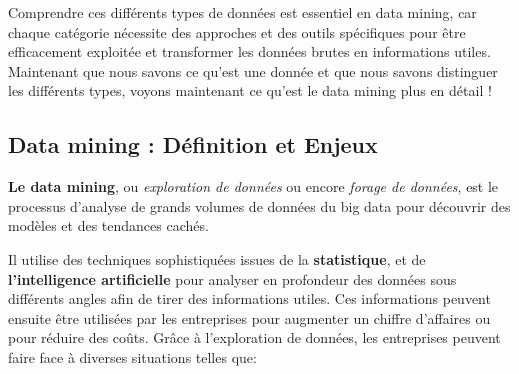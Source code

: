 \documentclass[a4paper,14pt]{article}
\begin{document}
        Comprendre ces différents types de données est essentiel en data mining, car chaque catégorie nécessite des approches et des outils spécifiques pour être efficacement exploitée et transformer les données brutes en informations utiles. \\
        
        Maintenant que nous savons ce qu’est une donnée et que nous savons distinguer les différents types, voyons maintenant ce qu’est le data mining plus en détail !
    

    \subsection{Data mining : Définition et Enjeux}
        \textbf{Le data mining}, ou \textit{exploration de données} ou encore \textit{forage de données}, est le processus d'analyse de grands volumes de données du big data pour découvrir des modèles et des tendances cachés. 

        Il utilise des techniques sophistiquées issues de la \textbf{statistique}, et de \textbf{l'intelligence artificielle} pour analyser en profondeur des données sous différents angles afin de tirer des informations utiles. Ces informations peuvent ensuite être utilisées par les entreprises pour augmenter un chiffre d’affaires ou pour réduire des coûts.
        Grâce à l'exploration de données, les entreprises peuvent faire face à diverses situations telles que:   
\end{document}
